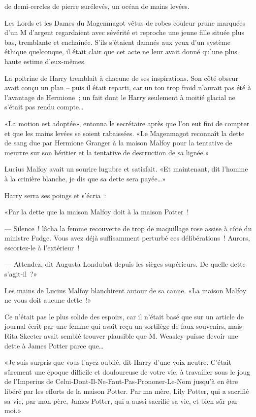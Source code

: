 
 de demi-cercles de pierre surélevés, un océan de mains levées.

\hplettrineextrapara
Les Lords et les Dames du Magenmagot vêtus de robes couleur prune marquées d'un M d'argent regardaient avec sévérité et reproche une jeune fille située plus bas, tremblante et enchaînée. S'ils s'étaient damnés aux yeux d'un système éthique quelconque, il était clair que cet acte ne leur avait donné qu'une plus haute estime d'eux-mêmes.

La poitrine de Harry tremblait à chacune de ses inspirations. Son côté obscur avait conçu un plan -- puis il était reparti, car un ton trop froid n'aurait pas été à l'avantage de Hermione~; un fait dont le Harry seulement à moitié glacial ne s'était pas rendu compte…

«La motion est adoptée», entonna le secrétaire après que l'on eut fini de compter et que les mains levées se soient rabaissées. «Le Magenmagot reconnaît la dette de sang due par Hermione Granger à la maison Malfoy pour la tentative de meurtre sur son héritier et la tentative de destruction de sa lignée.»

Lucius Malfoy avait un sourire lugubre et satisfait. «Et maintenant, dit l'homme à la crinière blanche, je dis que sa dette sera payée…»

Harry serra ses poings et s'écria~:

«Par la dette que la maison Malfoy doit à la maison Potter~!

--- Silence~! lâcha la femme recouverte de trop de maquillage rose assise à côté du ministre Fudge. Vous avez déjà suffisamment perturbé ces délibérations~! Aurors, escortez-le à l'extérieur~!

--- Attendez, dit Augusta Londubat depuis les sièges supérieurs. De quelle dette s'agit-il~?»

Les mains de Lucius Malfoy blanchirent autour de sa canne. «La maison Malfoy ne vous doit aucune dette~!»

Ce n'était pas le plus solide des espoirs, car il n'était basé que sur un article de journal écrit par une femme qui avait reçu un sortilège de faux souvenirs, mais Rita Skeeter avait semblé trouver plausible que M. Weasley puisse devoir une dette à James Potter parce que…

«Je suis surpris que vous l'ayez oublié, dit Harry d'une voix neutre. C'était sûrement une époque difficile et douloureuse de votre vie, à travailler sous le joug de l'Imperius de Celui-Dont-Il-Ne-Faut-Pas-Prononer-Le-Nom jusqu'à en être libéré par les efforts de la maison Potter. Par ma mère, Lily Potter, qui a sacrifié sa vie, par mon père, James Potter, qui a aussi sacrifié sa vie, et bien sûr par moi.»

